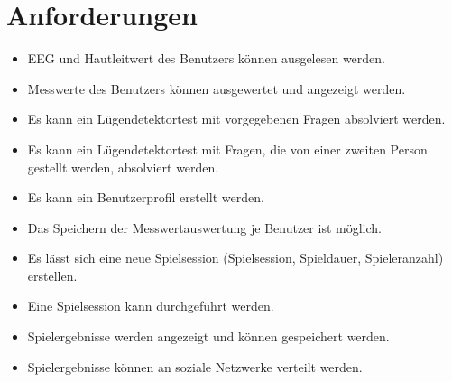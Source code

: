    	\section{Anforderungen}
	\begin{itemize}
	\item{}EEG und Hautleitwert des Benutzers können ausgelesen werden.
	\item{}Messwerte des Benutzers können ausgewertet und angezeigt werden.
	\item{}Es kann ein Lügendetektortest  mit vorgegebenen Fragen absolviert werden.
	\item{}Es kann ein Lügendetektortest mit Fragen, die von einer zweiten Person gestellt werden, absolviert werden.
	\item{}Es kann ein Benutzerprofil erstellt werden.
	\item{}Das Speichern der Messwertauswertung je Benutzer ist möglich.
	\item{}Es lässt sich eine neue Spielsession (Spielsession, Spieldauer, Spieleranzahl) erstellen.
	\item{}Eine Spielsession kann durchgeführt werden.
	\item{}Spielergebnisse werden angezeigt und können gespeichert werden.
	\item{}Spielergebnisse können an soziale Netzwerke verteilt werden.
	\end{itemize}		

